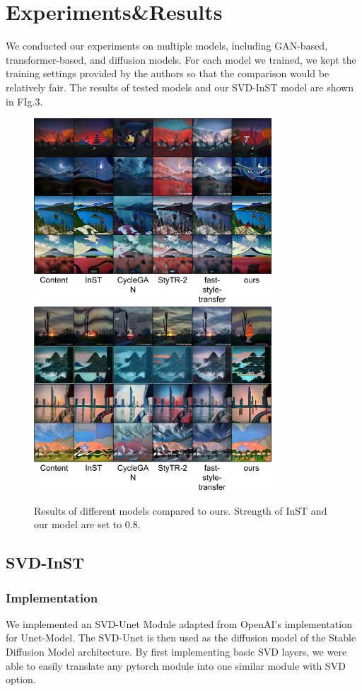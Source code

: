 \documentclass[conference]{IEEEtran}
\begin{document}
\section{Experiments&Results}
We conducted our experiments on multiple models, including GAN-based, transformer-based, and diffusion models. For each model we trained, we kept the training settings provided by the authors so that the comparison would be relatively fair. The results of tested models and our SVD-InST model are shown in FIg.3.

\begin{figure}[!t]
\centering
\includegraphics[width=3.5in]{result1.png}
\includegraphics[width=3.5in]{result2.png}
\caption{Results of different models compared to ours. Strength of InST and our model are set to 0.8.}
\label{approach_svd}
\end{figure}


\subsection{SVD-InST}



\subsubsection{Implementation}
We implemented an SVD-Unet Module adapted from OpenAI's implementation for Unet-Model. The SVD-Unet is then used as the diffusion model of the Stable Diffusion Model architecture. By first implementing basic SVD layers, we were able to easily translate any pytorch module into one similar module with SVD option.
\end{document}
